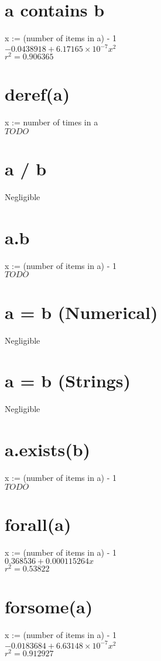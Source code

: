 \documentclass[12pt]{article}
\begin{document}
	\section{a contains b}
	x := (number of items in a) - 1\\
	$-0.0438918 + 6.17165 \times 10^{-7} x^2$\\
	$r^2 = 0.906365$
	
	\section{deref(a)}
	x := number of times in a\\
	$TODO$
	
	\section{a / b}
	Negligible
	
	\section{a.b}
	x := (number of items in a) - 1\\
	$TODO$
	
	\section{a = b (Numerical)}
	Negligible
	
	\section{a = b (Strings)}
	Negligible
	
	\section{a.exists(b)}
	x := (number of items in a) - 1\\
	$TODO$
	
	\section{forall(a)}
	x := (number of items in a) - 1\\
	$0.368536 + 0.000115264 x$\\
	$r^2 = 0.53822$
	
	\section{forsome(a)}
	x := (number of items in a) - 1\\
	$-0.0183684 + 6.63148 \times 10^{-7} x^2$\\
	$r^2 = 0.912927$
	
\end{document}
